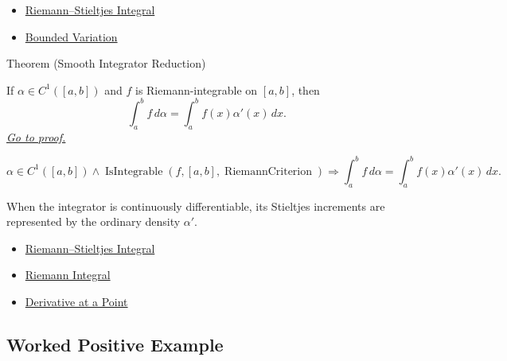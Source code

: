 \begin{dependencies}
\begin{itemize}
  \item \hyperref[def:riemann-stieltjes-integral]{Riemann--Stieltjes Integral}
  \item \hyperref[def:bounded-variation-integration]{Bounded Variation}
\end{itemize}
\end{dependencies}

\begin{theorembox}{Theorem (Smooth Integrator Reduction)}
\begin{theorem}
\label{thm:rs-c1-reduction}
If \(\alpha\in C^1([a,b])\) and \(f\) is Riemann-integrable on \([a,b]\), then
\[
  \int_a^b f\,d\alpha=\int_a^b f(x)\alpha'(x)\,dx .
\]
\hyperref[prf:rs-c1-reduction]{\textit{Go to proof.}}
\end{theorem}
\end{theorembox}

\begin{remark*}
\[
\alpha\in C^1([a,b])\land\operatorname{IsIntegrable}(f,[a,b],\operatorname{RiemannCriterion})
\Longrightarrow
\int_a^b f\,d\alpha=\int_a^b f(x)\alpha'(x)\,dx.
\]
\end{remark*}

\begin{remark*}[Interpretation]
When the integrator is continuously differentiable, its Stieltjes increments
are represented by the ordinary density \(\alpha'\).
\end{remark*}

\begin{dependencies}
\begin{itemize}
  \item \hyperref[def:riemann-stieltjes-integral]{Riemann--Stieltjes Integral}
  \item \hyperref[def:riemann-integral]{Riemann Integral}
  \item \hyperref[def:derivative-at-a-point]{Derivative at a Point}
\end{itemize}
\end{dependencies}

\subsection*{Worked Positive Example}

